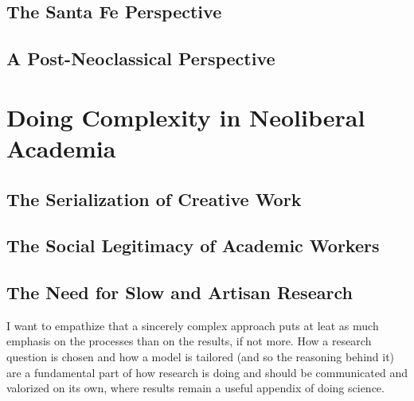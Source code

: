 \documentclass[a4paper, headings=standardclasses]{scrartcl}
\begin{document}
	\subsection{The Santa Fe Perspective}
	
	\subsection{A Post-Neoclassical Perspective}
	
	\section{Doing Complexity in Neoliberal Academia}
	\subsection{The Serialization of Creative Work}
	
    \subsection{The Social Legitimacy of Academic Workers}

	\subsection{The Need for Slow and Artisan Research}
	I want to empathize that a sincerely complex approach puts at leat as much emphasis on the processes than on the results, if not more. How a research question is chosen and how a model is tailored (and so the reasoning behind it) are a fundamental part of how research is doing and should be communicated and valorized on its own, where results remain a useful appendix of doing science.

	\printbibliography
	
\end{document}
